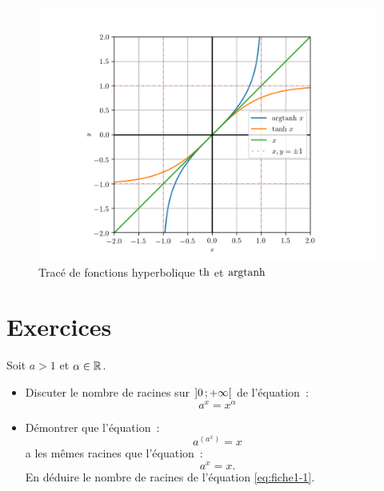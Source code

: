%
\begin{figure}
  \centering
  \includegraphics[scale=0.6]{argtanh.png}
  \caption{Tracé de fonctions hyperbolique \(\operatorname{th}\) et \(\operatorname{argtanh}\)}
  \label{fig:tracetanhargth}
\end{figure}
\cleardoublepage
\section{Exercices}
\begin{exercice}
    Soit \(a > 1\) et \(\alpha \in \mathbb{R}\).
    \begin{itemize}
        \item Discuter le nombre de racines sur \(\left] 0 \, ;  +\infty \right[\) de l'équation~:
            \begin{equation}
                \label{eq:fiche1-1}
                a^x = x^\alpha
            \end{equation}
        \item Démontrer que l'équation~:
            \begin{equation}
                a^(a^x) = x
            \end{equation}
            a les mêmes racines que l'équation~:
            \begin{equation}
                a^x = x.
            \end{equation}
            En déduire le nombre de racines de l'équation \eqref{eq:fiche1-1}.
    \end{itemize}
\end{exercice}
